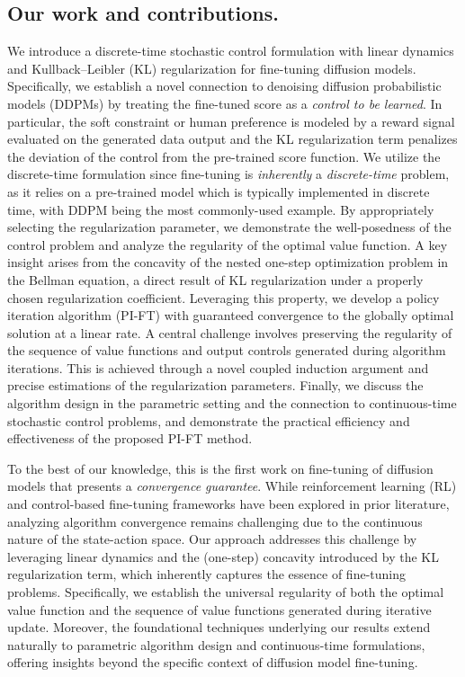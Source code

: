 \documentclass{article}
\begin{document}
\subsection*{Our work and contributions.}
We introduce a discrete-time stochastic control formulation with linear dynamics and Kullback–Leibler (KL) regularization for fine-tuning diffusion models. Specifically, we establish a novel connection to denoising diffusion probabilistic models (DDPMs) \cite{Ho20} by treating the fine-tuned score as a {\it control to be learned}. In particular, the soft constraint or human preference is modeled by a reward signal evaluated on the generated data output and the KL regularization term penalizes the deviation of the control from the pre-trained score function. We utilize the discrete-time formulation since fine-tuning is {\it inherently} a {\it discrete-time} problem, as it relies on a pre-trained model which is typically implemented in discrete time, with DDPM being the most commonly-used example. By appropriately selecting the regularization parameter, we demonstrate the well-posedness of the control problem and analyze the regularity of the optimal value function. A key insight arises from the concavity of the nested one-step optimization problem in the Bellman equation, a direct result of KL regularization under a properly chosen regularization coefficient. Leveraging this property, we develop a policy iteration algorithm (PI-FT) with guaranteed convergence to the globally optimal solution at a linear rate. A central challenge involves preserving the regularity of the sequence of value functions and output controls generated during algorithm iterations. This is achieved through a novel coupled induction argument and precise estimations of the regularization parameters. Finally, we discuss the algorithm design in the parametric setting and the connection to continuous-time stochastic control problems,  and demonstrate the practical
efficiency and effectiveness of the proposed PI-FT method. 

%

To the best of our knowledge, this is the first work on fine-tuning of diffusion models that presents a {\it convergence guarantee}.
While reinforcement learning (RL) and control-based fine-tuning frameworks have been explored in prior literature, analyzing algorithm convergence remains challenging due to the continuous nature of the state-action space. 
Our approach addresses this challenge by leveraging linear dynamics and the (one-step) concavity introduced by the KL regularization term, which inherently captures the essence of fine-tuning problems. Specifically, we establish the universal regularity of both the optimal value function and the sequence of value functions generated during iterative update. Moreover, the foundational techniques underlying our results extend naturally to parametric algorithm design and continuous-time formulations, offering insights beyond the specific context of diffusion model fine-tuning.
\end{document}
